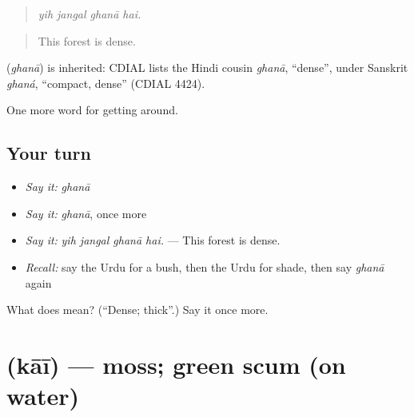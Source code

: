 \begin{quote}
   
\end{quote}

\begin{quote}
\emph{yih jangal ghanā hai.}
\end{quote}

\begin{quote}
This forest is dense.
\end{quote}

\begin{cousinweb}
\textbf{} (\emph{ghanā}) is inherited: CDIAL lists the Hindi cousin \emph{ghanā}, \textquotedblleft{}dense\textquotedblright{}, under Sanskrit \emph{ghaná}, \textquotedblleft{}compact, dense\textquotedblright{} (CDIAL 4424).
\end{cousinweb}

\begin{grammarlens}[title={What you've built}]
One more word for getting around.
\end{grammarlens}

\subsection*{Your turn}
\begin{itemize}
\raggedright
  \item \emph{Say it:} \emph{ghanā}
  \item \emph{Say it:} \emph{ghanā}, once more
  \item \emph{Say it:} \emph{yih jangal ghanā hai.} — This forest is dense.
  \item \emph{Recall:} say the Urdu for a bush, then the Urdu for shade, then say \emph{ghanā} again
\end{itemize}

\begin{tcolorbox}[breakable,colback=teal!4,colframe=teal!35!black,title={Before you move on}]
What does  mean? (\textquotedblleft{}Dense; thick\textquotedblright{}.) Say it once more.
\end{tcolorbox}
\section[\texorpdfstring{\ur{کائی} (kāī)}{کائی (kāī)}]{ (kāī) — moss; green scum (on water)}

\label{lesson:UR-C437-kai}



